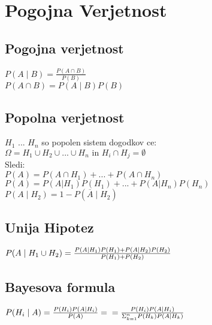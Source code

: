 \section{Pogojna Verjetnost}
\subsection{Pogojna verjetnost}
$P(A\mid B)=\frac{P(A\cap B)}{P(B)}$\\
$P(A\cap B)=P(A\mid B)P(B)$

\subsection{Popolna verjetnost}
$H_1$ ... $H_n$ so popolen sistem dogodkov ce:\\
$\Omega = H_1 \cup H_2 \cup ... \cup H_n \text{ in } H_i \cap H_j = \emptyset$\\
Sledi:\\
$P(A)=P(A\cap H_1) + ... + P(A\cap H_n)$\\
$P(A)=P(A|H_1)P(H_1)+...+P(A|H_n)P(H_n)$\\
$P(A\mid H_2)=1-P(\overline{A}\mid H_2)$\\

\subsection{Unija Hipotez}
$P(A\mid H_1\cup H_2)=\\\frac{P(A|H_1)P(H_1)+P(A|H_2)P(H_2)}{P(H_1)+P(H_2)}$

\subsection{Bayesova formula}
$P(H_i\mid A)=\frac{P(H_i)P(A|H_i)}{P(A)}=\\=\frac{P(H_i)P(A|H_i)}{\Sigma^n_{k=1}P(H_k)P(A|H_k)}$\\